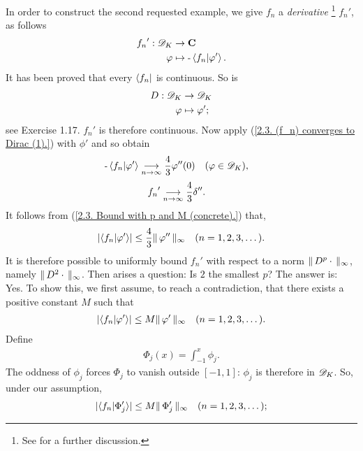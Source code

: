 In order to construct the second requested example, we give %
%
  ${f_n}$ %
%
a \textit{derivative}%
%
  \footnote{
    See  
    for a further discussion.
  } %
${f_n}'$, as follows %
%
  \begin{align}
    {f_n}': {\mathscr D}_K &\to {\mathbf C}\\
                    \varphi &\mapsto \text{\small{-}} \bra{f_n}\ket{\varphi'}. \nonumber
  \end{align}
%
It has been proved that every $\bra{f_n}$ is continuous. %
So is %
%
  \begin{align}
    D : {\mathscr D}_K & \to {\mathscr D}_K \\
        \varphi & \mapsto \varphi'; \nonumber
  \end{align}
see  Exercise 1.17. %
${f_n}'$ is therefore continuous. Now apply %
%
  (\ref{2.3. (f_n) converges to Dirac (1).}) %
%
with $\phi'$ and so obtain %
%
  \begin{align}
    \text{\small{-}} \bra{f_n}\ket{\varphi'} &\underset{n\to \infty}{\longrightarrow} \frac{4}{3} \varphi''(0)
    \quad(\varphi \in {\mathscr D}_K), \nonumber
  \end{align}
%
\ie %
%
  \begin{align}
    {f_n}' &\underset{n\to \infty}{\longrightarrow} \frac{4}{3} \delta''. 
  \end{align}
%
It follows from %
%
  (\ref{2.3. Bound with p and M (concrete).}) %
%
that, 
%
  \begin{align}
  \lvert \bra{f_n}\ket{\varphi'} \rvert 
    \leq 
  \frac{4}{3} \| \, \varphi'' \, \|_{\infty} \quad (n=1, 2, 3, \dots).
  \end{align}
%
It is therefore possible to uniformly bound 
%
  ${f_n}'$ %
%
with respect to a norm %
%
  $\| \,D^p\cdot \, \|_{\infty}$, %
%
namely $\| \,D^2\cdot \, \|_{\infty}$. 
%
Then arises a question: %
%
  Is $2$ the smallest $p$? 
%
The answer is: Yes. 
%
To show this, we first assume, to reach a contradiction, that %
%
  there exists a positive constant $M$ such that
%
  \begin{align}
    \lvert \langle f_n \lvert \varphi' \rangle \rvert 
      \leq 
    M \| \,\varphi' \, \|_{\infty} 
    \quad (n=1, 2, 3, \dots).
  \end{align}
%
Define %
%
  \begin{align}
    \Phi_{j}(x) = \int_{\minus 1}^x \phi_j.
  \end{align}
%
The oddness of $\phi_j$ forces %
% 
  $\Phi_{j}$ to vanish outside $[\minus 1, 1]$: %
%
$\phi_{j}$ is therefore in ${\mathscr D}_K$. So, under our assumption, 
%
  \begin{align}
    \lvert 
      \langle{f_n}\lvert \Phi_j' \rangle
    \rvert 
      \leq 
    M \| \,\Phi_{j}' \, \|_{\infty}
    \quad (n=1, 2, 3, \dots); 
  \end{align}
